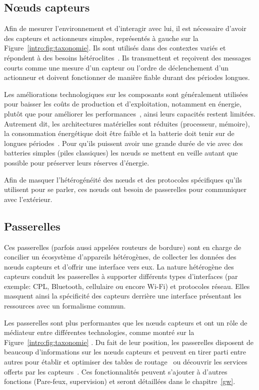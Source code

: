 \subsection{Nœuds capteurs}

Afin de mesurer l'environnement et d'interagir avec lui, il est nécessaire d'avoir des capteurs et actionneurs simples, représentés à gauche sur la Figure~\ref{intro:fig:taxonomie}.
Ils sont utilisés dans des contextes variés et répondent à des besoins hétéroclites~\cite{werner2006deploying}.
Ils transmettent et reçoivent des messages courts comme une mesure d'un capteur ou l'ordre de déclenchement d'un actionneur et doivent fonctionner de manière fiable durant des périodes longues.

Les améliorations technologiques sur les composants sont généralement utilisées pour baisser les coûts de production et d'exploitation, notamment en énergie, plutôt que pour améliorer les performances~\cite{murugesan2008harnessing}, ainsi leurs capacités restent limitées.
Autrement dit, les architectures matérielles sont réduites (processeur, mémoire), la consommation énergétique doit être faible et la batterie doit tenir sur de longues périodes~\cite{werner2006deploying}.
Pour qu'ils puissent avoir une grande durée de vie avec des batteries simples (piles classiques) les nœuds se mettent en veille autant que possible pour préserver leurs réserves d'énergie.

Afin de masquer l'hétérogénéité des nœuds et des protocoles spécifiques qu'ils utilisent pour se parler, ces nœuds ont besoin de passerelles pour communiquer avec l'extérieur.

\subsection{Passerelles}

Ces passerelles (parfois aussi appelées routeurs de bordure) sont en charge de concilier un écosystème d'appareils hétérogènes, de collecter les données des nœuds capteurs et d'offrir une interface vers eux.
La nature hétérogène des capteurs conduit les passerelles à supporter différents types d'interfaces (par exemple: \ac{CPL}, Bluetooth, cellulaire ou encore Wi-Fi) et protocoles réseau.
Elles masquent ainsi la spécificité des capteurs derrière une interface présentant les ressources avec un formalisme commun.

Les passerelles sont plus performantes que les nœuds capteurs et ont un rôle de médiateur entre différentes technologies, comme montré sur la Figure~\ref{intro:fig:taxonomie} .
Du fait de leur position, les passerelles disposent de beaucoup d'informations sur les nœuds capteurs et peuvent en tirer parti entre autres pour établir et optimiser des tables de routage~\cite{rfc6550} ou découvrir les services offerts par les capteurs~\cite{cirani2014scalable}.
Ces fonctionnalités peuvent s'ajouter à d'autres fonctions (Pare-feux, supervision) et seront détaillées dans le chapitre~\ref{gw}.

